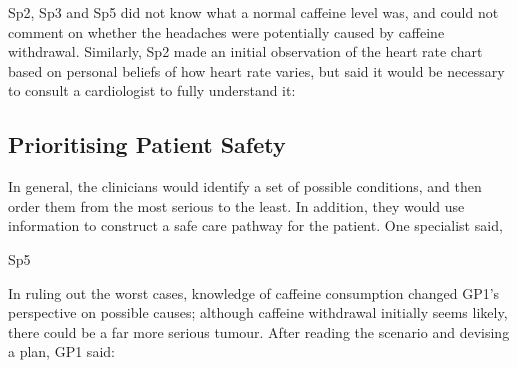 \documentclass{sigchi}
\begin{document}
Sp2, Sp3 and Sp5 did not know what a normal caffeine level was, and could not comment on whether the headaches were potentially caused by caffeine withdrawal. Similarly, Sp2 made an initial observation of the heart rate chart based on personal beliefs of how heart rate varies, but said it would be necessary to consult a cardiologist to fully understand it:


\subsection{Prioritising Patient Safety}

In general, the clinicians would identify a set of possible conditions, and then order them from the most serious to the least.  In addition, they would use information to construct a safe care pathway for the patient.  One specialist said,





 {Sp5}



In ruling out the worst cases, knowledge of caffeine consumption changed GP1's perspective on possible causes; although caffeine withdrawal initially seems likely, there could be a far more serious tumour. After reading the scenario and devising a plan, GP1 said:
\end{document}

